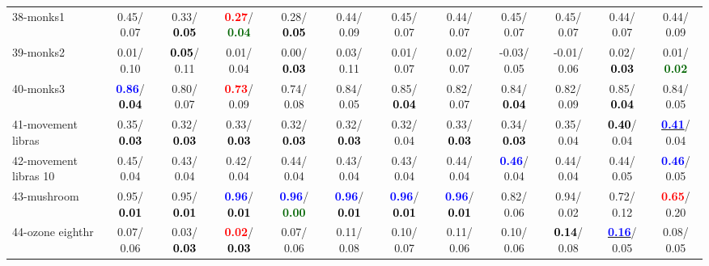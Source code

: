 \begin{table}[h]
\begin{center}
{\begin{tabular}{lc|c|c|c|c|c|c|c|c|c|c}
38-monks1 &   0.45/  0.07 &   0.33/\textcolor{black}{\textbf{  0.05}} & \textcolor{red}{\textbf{  0.27}}/\textcolor{darkgreen}{\textbf{  0.04}} &   0.28/\textcolor{black}{\textbf{  0.05}} &   0.44/  0.09 &   0.45/  0.07 &   0.44/  0.07 &   0.45/  0.07 &   0.45/  0.07 &   0.44/  0.07 &   0.44/  0.09 \\
39-monks2 &   0.01/  0.10 & \textcolor{black}{\textbf{  0.05}}/  0.11 &   0.01/  0.04 &   0.00/\textcolor{black}{\textbf{  0.03}} &   0.03/  0.11 &   0.01/  0.07 &   0.02/  0.07 &  -0.03/  0.05 &  -0.01/  0.06 &   0.02/\textcolor{black}{\textbf{  0.03}} &   0.01/\textcolor{darkgreen}{\textbf{  0.02}} \\ \hline
40-monks3 & \textcolor{blue}{\textbf{  0.86}}/\textcolor{black}{\textbf{  0.04}} &   0.80/  0.07 & \textcolor{red}{\textbf{  0.73}}/  0.09 &   0.74/  0.08 &   0.84/  0.05 &   0.85/\textcolor{black}{\textbf{  0.04}} &   0.82/  0.07 &   0.84/\textcolor{black}{\textbf{  0.04}} &   0.82/  0.09 &   0.85/\textcolor{black}{\textbf{  0.04}} &   0.84/  0.05 \\
41-movement libras &   0.35/\textcolor{black}{\textbf{  0.03}} &   0.32/\textcolor{black}{\textbf{  0.03}} &   0.33/\textcolor{black}{\textbf{  0.03}} &   0.32/\textcolor{black}{\textbf{  0.03}} &   0.32/\textcolor{black}{\textbf{  0.03}} &   0.32/  0.04 &   0.33/\textcolor{black}{\textbf{  0.03}} &   0.34/\textcolor{black}{\textbf{  0.03}} &   0.35/  0.04 & \textcolor{black}{\textbf{  0.40}}/  0.04 & \underline{\textcolor{blue}{\textbf{  0.41}}}/  0.04 \\
42-movement libras 10 &   0.45/  0.04 &   0.43/  0.04 &   0.42/  0.04 &   0.44/  0.04 &   0.43/  0.04 &   0.43/  0.04 &   0.44/  0.04 & \textcolor{blue}{\textbf{  0.46}}/  0.04 &   0.44/  0.04 &   0.44/  0.05 & \textcolor{blue}{\textbf{  0.46}}/  0.05 \\
43-mushroom &   0.95/\textcolor{black}{\textbf{  0.01}} &   0.95/\textcolor{black}{\textbf{  0.01}} & \textcolor{blue}{\textbf{  0.96}}/\textcolor{black}{\textbf{  0.01}} & \textcolor{blue}{\textbf{  0.96}}/\textcolor{darkgreen}{\textbf{  0.00}} & \textcolor{blue}{\textbf{  0.96}}/\textcolor{black}{\textbf{  0.01}} & \textcolor{blue}{\textbf{  0.96}}/\textcolor{black}{\textbf{  0.01}} & \textcolor{blue}{\textbf{  0.96}}/\textcolor{black}{\textbf{  0.01}} &   0.82/  0.06 &   0.94/  0.02 &   0.72/  0.12 & \textcolor{red}{\textbf{  0.65}}/  0.20 \\
44-ozone eighthr &   0.07/  0.06 &   0.03/\textcolor{black}{\textbf{  0.03}} & \textcolor{red}{\textbf{  0.02}}/\textcolor{black}{\textbf{  0.03}} &   0.07/  0.06 &   0.11/  0.08 &   0.10/  0.07 &   0.11/  0.06 &   0.10/  0.06 & \textcolor{black}{\textbf{  0.14}}/  0.08 & \underline{\textcolor{blue}{\textbf{  0.16}}}/  0.05 &   0.08/  0.05 \\

\end{tabular}}
\end{center}
\end{table}
